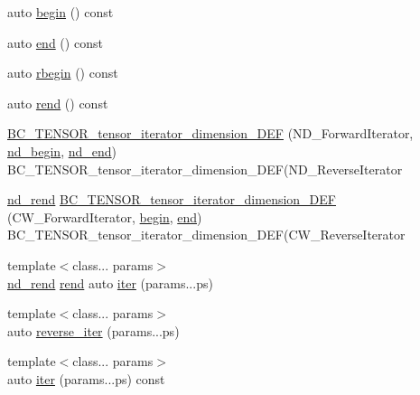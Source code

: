 \begin{DoxyCompactItemize}
\item 
auto \hyperlink{classBC_1_1tensors_1_1Tensor__IterAlgos_a748b5cffa84d33ffd0cf58fb08c7742f}{begin} () const 
\item 
auto \hyperlink{classBC_1_1tensors_1_1Tensor__IterAlgos_a91f3299a6c86d4d8484667473229c7e1}{end} () const 
\item 
auto \hyperlink{classBC_1_1tensors_1_1Tensor__IterAlgos_a1c1d51867811f97582de14441e200ee4}{rbegin} () const 
\item 
auto \hyperlink{classBC_1_1tensors_1_1Tensor__IterAlgos_a385ddd63f4ffeea47a449dc17f6eb30b}{rend} () const 
\item 
\hyperlink{classBC_1_1tensors_1_1Tensor__IterAlgos_a36778f76136af280bbc720488477cdfe}{B\+C\+\_\+\+T\+E\+N\+S\+O\+R\+\_\+tensor\+\_\+iterator\+\_\+dimension\+\_\+\+D\+EF} (N\+D\+\_\+\+Forward\+Iterator, \hyperlink{classBC_1_1tensors_1_1Tensor__IterAlgos_a791e906b41519aa00b5936c90f6691f9}{nd\+\_\+begin}, \hyperlink{classBC_1_1tensors_1_1Tensor__IterAlgos_a57c16c64298dc18b878a50048bd2ffee}{nd\+\_\+end}) B\+C\+\_\+\+T\+E\+N\+S\+O\+R\+\_\+tensor\+\_\+iterator\+\_\+dimension\+\_\+\+D\+EF(N\+D\+\_\+\+Reverse\+Iterator
\item 
\hyperlink{classBC_1_1tensors_1_1Tensor__IterAlgos_a8109154106e723b1957c6c22e14ab9b5}{nd\+\_\+rend} \hyperlink{classBC_1_1tensors_1_1Tensor__IterAlgos_a3e8baece45308545f760109f1c21ecc9}{B\+C\+\_\+\+T\+E\+N\+S\+O\+R\+\_\+tensor\+\_\+iterator\+\_\+dimension\+\_\+\+D\+EF} (C\+W\+\_\+\+Forward\+Iterator, \hyperlink{classBC_1_1tensors_1_1Tensor__IterAlgos_a73b44ff31a6c22a172e03f31af4e4d64}{begin}, \hyperlink{classBC_1_1tensors_1_1Tensor__IterAlgos_a5bb5cbc94944c7225db9fd594656f011}{end}) B\+C\+\_\+\+T\+E\+N\+S\+O\+R\+\_\+tensor\+\_\+iterator\+\_\+dimension\+\_\+\+D\+EF(C\+W\+\_\+\+Reverse\+Iterator
\item 
{\footnotesize template$<$class... params$>$ }\\\hyperlink{classBC_1_1tensors_1_1Tensor__IterAlgos_a8109154106e723b1957c6c22e14ab9b5}{nd\+\_\+rend} \hyperlink{classBC_1_1tensors_1_1Tensor__IterAlgos_adec36bd5bba166de15c61579fcd5119b}{rend} auto \hyperlink{classBC_1_1tensors_1_1Tensor__IterAlgos_a5a6fe492656230dba26f4736215170f5}{iter} (params...\+ps)
\item 
{\footnotesize template$<$class... params$>$ }\\auto \hyperlink{classBC_1_1tensors_1_1Tensor__IterAlgos_af992794919c12bb33558db90082e9f5a}{reverse\+\_\+iter} (params...\+ps)
\item 
{\footnotesize template$<$class... params$>$ }\\auto \hyperlink{classBC_1_1tensors_1_1Tensor__IterAlgos_a54a7ee1dfa7bbc5f9843362de1d611df}{iter} (params...\+ps) const 

\end{DoxyCompactItemize}
